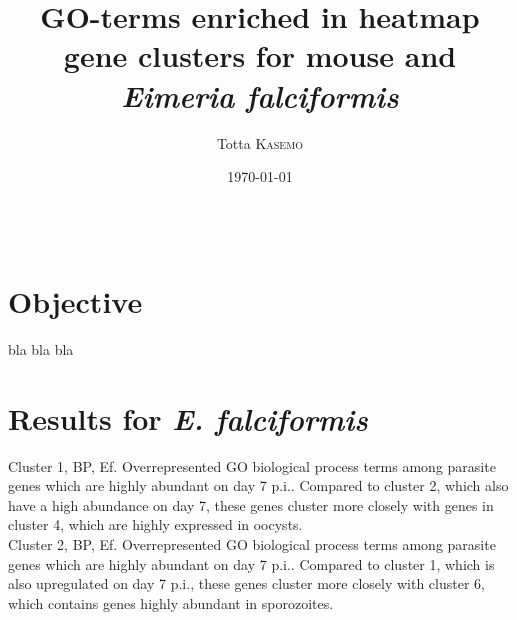 \documentclass{article}
\title{GO-terms enriched in heatmap gene clusters for mouse and \textit{Eimeria falciformis}} %
\author{Totta \textsc{Kasemo}} %
\date{\today} %
\begin{document}
\maketitle %

\begin{center}
\begin{tabular}{l r}
\end{tabular}
\end{center}



\section{Objective}
bla bla bla
\newpage


\section{Results for \textit{E. falciformis}}
  Cluster 1, BP, Ef.
  Overrepresented GO biological process terms among parasite genes which are 
  highly abundant on day 7 p.i.. Compared to cluster 2, which also have a high
  abundance on day 7, these genes cluster more closely with genes in cluster 4, 
  which are highly expressed in oocysts.\\
  

  Cluster 2, BP, Ef.
  Overrepresented GO biological process terms among parasite genes which are 
  highly abundant on day 7 p.i.. Compared to cluster 1, which is also upregulated 
  on day 7 p.i., these genes cluster more closely with cluster 6, which contains
  genes highly abundant in sporozoites.\\
  
\end{document}
